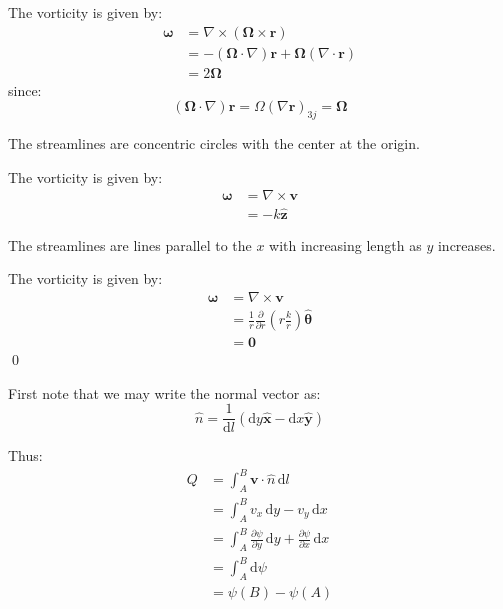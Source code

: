 \documentclass[12pt]{article}
\begin{document}

The vorticity is given by:
\begin{equation}
    \begin{split}
        \mathbf{\omega} &= \nabla \times (\mathbf{\Omega} \times \mathbf{r}) \\
        &= -(\mathbf{\Omega} \cdot \nabla) \mathbf{r} + \mathbf{\Omega} (\nabla \cdot \mathbf{r}) \\
        &= 2 \mathbf{\Omega}
    \end{split}
\end{equation}
since:
\begin{equation}
    (\mathbf{\Omega} \cdot \nabla) \mathbf{r}= \Omega (\nabla \mathbf{r})_{3j} = \mathbf{\Omega}
\end{equation}

The streamlines are concentric circles with the center at the origin.

The vorticity is given by:
\begin{equation}
    \begin{split}
        \mathbf{\omega} &= \nabla \times \mathbf{v} \\
        &= -k \hat{\mathbf{z}}
    \end{split}
\end{equation}

The streamlines are lines parallel to the $x$ with increasing length as $y$ increases.

The vorticity is given by:
\begin{equation}
    \begin{split}
        \mathbf{\omega} &= \nabla \times \mathbf{v} \\
        &= \frac{1}{r} \frac{\partial}{\partial r} \left( r \frac{k}{r} \right) \hat{\mathbf{\theta}} \\
        &= \mathbf{0}
    \end{split}
\end{equation}
\qed



First note that we may write the normal vector as:
\begin{equation}
    \hat{n} = \frac{1}{\mathrm{d}l} (\mathrm{d}y \hat{\mathbf{x}} - \mathrm{d}x \hat{\mathbf{y}})
\end{equation}

Thus:
\begin{equation}
    \begin{split}
        Q &= \int_{A}^{B} \mathbf{v} \cdot \hat{n} \, \mathrm{d}l \\
        &= \int_{A}^{B} v_{x} \, \mathrm{d}y - v_{y} \, \mathrm{d}x \\
        &= \int_{A}^{B} \frac{\partial \psi}{\partial y} \, \mathrm{d}y + \frac{\partial \psi}{\partial x} \, \mathrm{d}x \\
        &= \int_{A}^{B} \mathrm{d}\psi \\
        &= \psi(B) - \psi(A)
    \end{split}
\end{equation}
\end{document}
